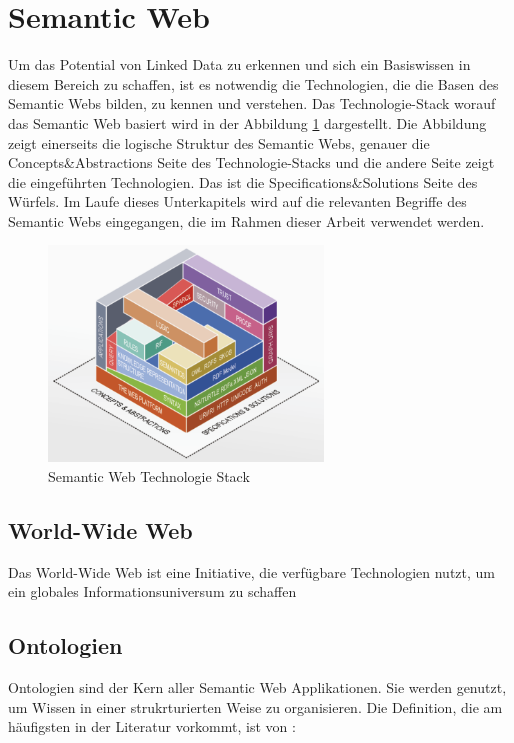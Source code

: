 \section{Semantic Web}\label{sec:sw}

Um das Potential von Linked Data zu erkennen und sich ein Basiswissen in diesem Bereich zu schaffen, ist es notwendig die Technologien, die die Basen des Semantic Webs bilden, zu kennen und verstehen. 
Das Technologie-Stack worauf das Semantic Web basiert wird in der Abbildung \ref{fig:abb1} dargestellt.
Die Abbildung zeigt einerseits die logische Struktur des Semantic Webs, genauer die Concepts\&Abstractions Seite des Technologie-Stacks und die andere Seite zeigt die eingeführten Technologien.
Das ist die Specifications\&Solutions Seite des Würfels.
Im Laufe dieses Unterkapitels wird auf die relevanten Begriffe des Semantic Webs eingegangen, die im Rahmen dieser Arbeit verwendet werden.

\begin{figure}[h]
	\centering
    	\includegraphics[width=0.65\textwidth]{Images/Linked_Data_Tech_Stack}
   	\caption{Semantic Web Technologie Stack}
   	\label{fig:abb1}
\end{figure}

\subsection{World-Wide Web}

Das World-Wide Web ist eine Initiative, die verfügbare Technologien nutzt, um ein globales Informationsuniversum zu schaffen

\subsection{Ontologien}

Ontologien sind der Kern aller Semantic Web Applikationen. 
Sie werden genutzt, um Wissen in einer strukrturierten Weise zu organisieren.
Die Definition, die am häufigsten in der Literatur vorkommt, ist von \citet{gruber_translation_1993}:


